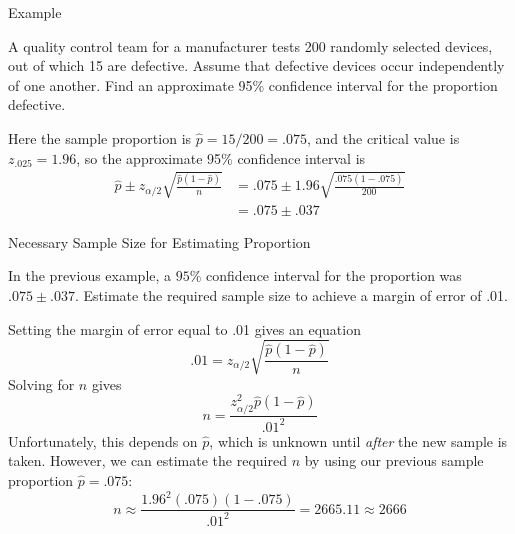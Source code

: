 \documentclass{beamer}
\begin{document}
\begin{frame}{Example}
\begin{block}{}
A quality control team for a manufacturer tests 200 randomly selected devices, out of which 15 are defective. Assume that defective devices occur independently of one another. Find an approximate 95\% confidence interval for the proportion defective.
\end{block}
\pause Here the sample proportion is $\hat p=15/200=.075$, and the critical value is $z_{.025}=1.96$, so the approximate 95\% confidence interval is
\begin{align*}
\hat p \pm z_{\alpha/2}\sqrt{\frac{\hat p(1-\hat p)}n} &= .075 \pm 1.96\sqrt{\frac{.075(1-.075)}{200}} \\
&= .075 \pm .037
\end{align*}
\end{frame}

\begin{frame}{Necessary Sample Size for Estimating Proportion}
\begin{block}{}
In the previous example, a $95\%$ confidence interval for the proportion was $.075 \pm .037$. Estimate the required sample size to achieve a margin of error of .01.
\end{block}
\pause Setting the margin of error equal to .01 gives an equation
$$.01=z_{\alpha/2}\sqrt{\frac{\hat p(1-\hat p)}n}$$
\pause Solving for $n$ gives
$$n=\frac{z_{\alpha/2}^2\hat p(1-\hat p)}{.01^2}$$
\pause Unfortunately, this depends on $\hat p$, which is unknown until \textit{after} the new sample is taken. \pause However, we can estimate the required $n$ by using our previous sample proportion $\hat p = .075$:
\pause
$$n \approx \frac{1.96^2(.075)(1-.075)}{.01^2}=2665.11 \approx 2666$$
\end{frame}
\end{document}
